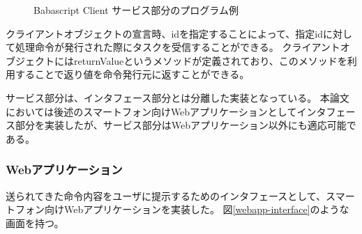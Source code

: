 \documentclass[twoside]{wiss}
\begin{document}
\begin{figure}[!h]  
  \centering
  \caption{Babascript Client サービス部分のプログラム例}
  \label{client_library}
\end{figure}

クライアントオブジェクトの宣言時、idを指定することによって、指定idに対して処理命令が発行された際にタスクを受信することができる。
クライアントオブジェクトにはreturnValueというメソッドが定義されており、このメソッドを利用することで返り値を命令発行元に返すことができる。

サービス部分は、インタフェース部分とは分離した実装となっている。
本論文においては後述のスマートフォン向けWebアプリケーションとしてインタフェース部分を実装したが、サービス部分はWebアプリケーション以外にも適応可能である。

\subsubsection{Webアプリケーション}

送られてきた命令内容をユーザに提示するためのインタフェースとして、スマートフォン向けWebアプリケーションを実装した。
図\ref{webapp-interface}のような画面を持つ。
\end{document}
